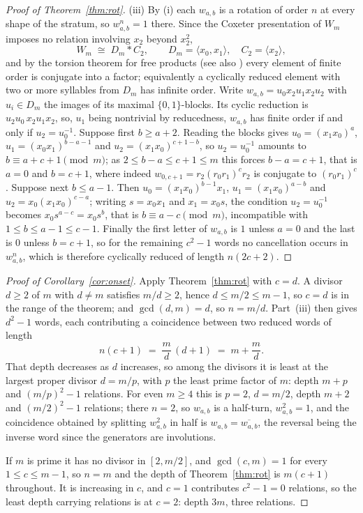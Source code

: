 \documentclass[11pt]{article}
\theoremstyle{definition}
\theoremstyle{remark}
\begin{document}
\begin{proof}[Proof of Theorem~\ref{thm:rot}]
(iii) By (i) each $w_{a,b}$ is a rotation of order $n$ at every shape of the
stratum, so $w_{a,b}^n=1$ there. Since the Coxeter presentation of $W_m$
imposes no relation involving $x_2$ beyond $x_2^2$,
\[
 W_m\;\cong\;D_m*C_2,\qquad D_m=\langle x_0,x_1\rangle,\quad C_2=\langle
 x_2\rangle,
\]
and by the torsion theorem for free products \cite[Thm.~4.5]{MKS} (see also
\cite[\S I.1.3]{Serre}) every element of finite order is conjugate into a factor; equivalently a cyclically reduced element with two or
more syllables from $D_m$ has infinite order. Write
$w_{a,b}=u_0x_2u_1x_2u_2$ with $u_i\in D_m$ the images of its maximal
$\{0,1\}$-blocks. Its cyclic reduction is $u_2u_0\,x_2u_1x_2$, so, $u_1$ being
nontrivial by reducedness, $w_{a,b}$ has finite order if and only if
$u_2=u_0^{-1}$. Suppose first $b\ge a+2$. Reading the blocks gives
$u_0=(x_1x_0)^a$, $u_1=(x_0x_1)^{b-a-1}$ and $u_2=(x_1x_0)^{c+1-b}$, so
$u_2=u_0^{-1}$ amounts to $b\equiv a+c+1\pmod{m}$; as $2\le b-a\le c+1\le m$
this forces $b-a=c+1$, that is $a=0$ and $b=c+1$, where indeed
$w_{0,c+1}=r_2(r_0r_1)^cr_2$ is conjugate to $(r_0r_1)^c$. Suppose next
$b\le a-1$. Then $u_0=(x_1x_0)^{b-1}x_1$, $u_1=(x_1x_0)^{a-b}$ and
$u_2=x_0(x_1x_0)^{c-a}$; writing $s=x_0x_1$ and $x_1=x_0s$, the condition
$u_2=u_0^{-1}$ becomes $x_0s^{a-c}=x_0s^{b}$, that is $b\equiv a-c\pmod{m}$,
incompatible with $1\le b\le a-1\le c-1$. Finally the first letter of
$w_{a,b}$ is $1$ unless $a=0$ and the last is $0$ unless $b=c+1$, so for the
remaining $c^2-1$ words no cancellation occurs in $w_{a,b}^n$, which is
therefore cyclically reduced of length $n(2c+2)$.
\end{proof}

\begin{proof}[Proof of Corollary~\ref{cor:onset}]
Apply Theorem~\ref{thm:rot} with $c=d$. A divisor $d\ge2$ of $m$ with $d\neq m$
satisfies $m/d\ge2$, hence $d\le m/2\le m-1$, so $c=d$ is in the range of the
theorem; and $\gcd(d,m)=d$, so $n=m/d$. Part~(iii) then gives $d^2-1$ words,
each contributing a coincidence between two reduced words of length
\[
 n(c+1)\;=\;\frac{m}{d}\,(d+1)\;=\;m+\frac md .
\]
That depth decreases as $d$ increases, so among the divisors it is least at the
largest proper divisor $d=m/p$, with $p$ the least prime factor of $m$: depth
$m+p$ and $(m/p)^2-1$ relations. For even $m\ge4$ this is $p=2$, $d=m/2$, depth
$m+2$ and $(m/2)^2-1$ relations; there $n=2$, so $w_{a,b}$ is a half-turn,
$w_{a,b}^2=1$, and the coincidence obtained by splitting $w_{a,b}^2$ in half is
$w_{a,b}=\overline{w_{a,b}}$, the reversal being the inverse word since the
generators are involutions.

If $m$ is prime it has no divisor in $[2,m/2]$, and $\gcd(c,m)=1$ for every
$1\le c\le m-1$, so $n=m$ and the depth of Theorem~\ref{thm:rot} is $m(c+1)$
throughout. It is increasing in $c$, and $c=1$ contributes $c^2-1=0$ relations,
so the least depth carrying relations is at $c=2$: depth $3m$, three relations.
\end{proof}
\end{document}
